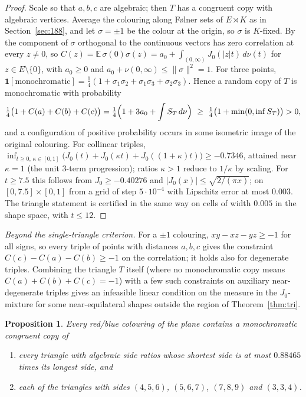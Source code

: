 \documentclass[11pt]{amsart}
\newtheorem{proposition}[theorem]{Proposition}
\theoremstyle{definition}
\newcommand{\E}{\mathbb{E}}
\begin{document}
\begin{proof}
Scale so that $a,b,c$ are algebraic; then $T$ has a congruent copy with algebraic vertices. Average the colouring along F\o lner sets of $E\rtimes K$ as in Section~\ref{sec:188}, and let $\sigma=\pm1$ be the colour at the origin, so $\sigma$ is $K$-fixed. By~\cite[Theorem 2.3]{OAI} the component of $\sigma$ orthogonal to the continuous vectors has zero correlation at every $z\ne0$, so $C(z)=\E\,\sigma(0)\sigma(z)=a_0+\int_{(0,\infty)}J_0(|z|t)\,d\nu(t)$ for $z\in E\setminus\{0\}$, with $a_0\ge0$ and $a_0+\nu(0,\infty)\le\|\sigma\|^2=1$. For three points, $\mathbf 1[\text{monochromatic}]=\frac14(1+\sigma_1\sigma_2+\sigma_1\sigma_3+\sigma_2\sigma_3)$. Hence a random copy of $T$ is monochromatic with probability
\[
\tfrac14\bigl(1+C(a)+C(b)+C(c)\bigr)=\tfrac14\Bigl(1+3a_0+\int S_T\,d\nu\Bigr)\ \ge\ \tfrac14\bigl(1+\min(0,\inf S_T)\bigr)>0,
\]
and a configuration of positive probability occurs in some isometric image of the original colouring. For collinear triples, $\inf_{t\ge0,\,\kappa\in[0,1]}\bigl(J_0(t)+J_0(\kappa t)+J_0((1+\kappa)t)\bigr)\ge-0.7346$, attained near $\kappa=1$ (the unit $3$-term progression); ratios $\kappa>1$ reduce to $1/\kappa$ by scaling. For $t\ge7.5$ this follows from $J_0\ge-0.40276$ and $|J_0(x)|\le\sqrt{2/(\pi x)}$; on $[0,7.5]\times[0,1]$ from a grid of step $5\cdot10^{-4}$ with Lipschitz error at most $0.003$. The triangle statement is certified in the same way on cells of width $0.005$ in the shape space, with $t\le12$.
\end{proof}

\emph{Beyond the single-triangle criterion.} For a $\pm1$ colouring, $xy-xz-yz\ge-1$ for all signs, so every triple of points with distances $a,b,c$ gives the constraint $C(c)-C(a)-C(b)\ge-1$ on the correlation; it holds also for degenerate triples. Combining the triangle $T$ itself (where no monochromatic copy means $C(a)+C(b)+C(c)=-1$) with a few such constraints on auxiliary near-degenerate triples gives an infeasible linear condition on the measure in the $J_0$-mixture for some near-equilateral shapes outside the region of Theorem~\ref{thm:tri}.

\begin{proposition}\label{prop:tri567}
Every red/blue colouring of the plane contains a monochromatic congruent copy of
\begin{enumerate}[label=(\alph*)]
\item every triangle with algebraic side ratios whose shortest side is at most $0.88465$ times its longest side, and
\item each of the triangles with sides $(4,5,6)$, $(5,6,7)$, $(7,8,9)$ and $(3,3,4)$.
\end{enumerate}
\end{proposition}
\end{document}
